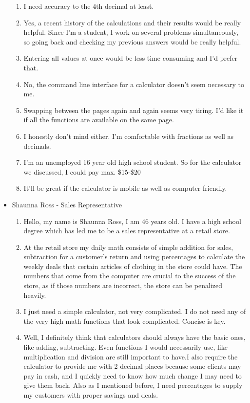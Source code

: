 \begin{itemize}
\begin{enumerate}
                        \item I need accuracy to the 4th decimal at least.
                        \item Yes, a recent history of the calculations and their results would be really helpful. Since I’m a student, I work on several problems simultaneously, so going back and checking my previous answers would be really helpful.
                        \item Entering all values at once would be less time consuming and I’d prefer that.
                        \item No, the command line interface for a calculator doesn’t seem necessary to me.
                        \item Swapping between the pages again and again seems very tiring. I’d like it if all the functions are available on the same page.
                        \item I honestly don’t mind either. I’m comfortable with fractions as well as decimals.
                        \item I’m an unemployed 16 year old high school student. So for the calculator we discussed, I could pay max. \$15-\$20
                        \item It’ll be great if the calculator is mobile as well as computer friendly.
                    \end{enumerate}
                \item Shaunna Ross - Sales Representative
                    \begin{enumerate}
                        \item Hello, my name is Shaunna Ross, I am 46 years old. I have a high school degree which has led me to be a sales representative at a retail store.
                        \item At the retail store my daily math consists of simple addition for sales, subtraction for a customer’s return and using percentages to calculate the weekly deals that certain articles of clothing in the store could have. The numbers that come from the computer are crucial to the success of the store, as if those numbers are incorrect, the store can be penalized heavily.
                        \item I just need a simple calculator, not very complicated. I do not need any of the very high math functions that look complicated. Concise is key.
                        \item Well, I definitely think that calculators should always have the basic ones, like adding, subtracting. Even functions I would necessarily use, like multiplication and division are still important to have.I also require the calculator to provide me with 2 decimal places because some clients may pay in cash, and I quickly need to know how much change I may need to give them back. Also as I mentioned before, I need percentages to supply my customers with proper savings and deals.

\end{enumerate}
\end{itemize}
